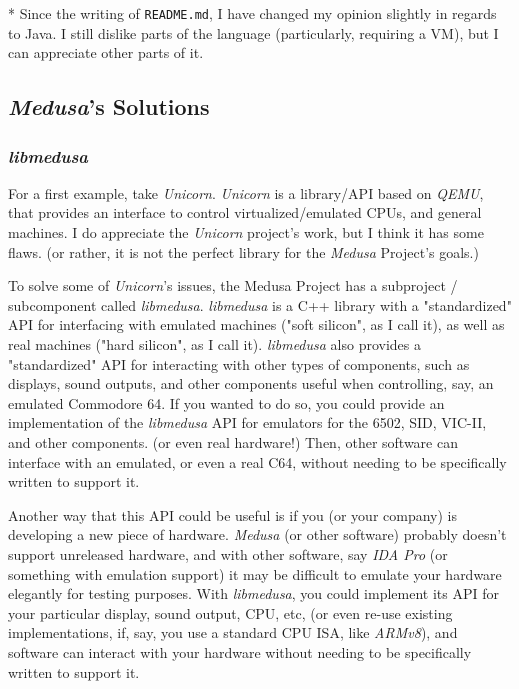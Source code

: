 \documentclass{article}
\begin{document}
	* Since the writing of \texttt{README.md}, I have changed my opinion slightly
	in regards to Java. I still dislike parts of the language (particularly,
	requiring a VM), but I can appreciate other parts of it.

	\subsection{\textit{Medusa}'s Solutions}
	\subsubsection{\textit{libmedusa}}
	For a first example, take \textit{Unicorn}. \textit{Unicorn} is a
	library/API based on \textit{QEMU}, that provides an interface to control
	virtualized/emulated CPUs, and general machines. I do appreciate the
	\textit{Unicorn} project's work, but I think it has some flaws. (or rather,
	it is not the perfect library for the \textit{Medusa} Project's goals.)

	To solve some of \textit{Unicorn}'s issues, the Medusa Project has a
	subproject / subcomponent called \textit{libmedusa}. \textit{libmedusa} is
	a C++ library with a "standardized" API for interfacing with emulated
	machines ("soft silicon", as I call it), as well as real machines ("hard
	silicon", as I call it). \textit{libmedusa} also provides a "standardized"
	API for interacting with other types of components, such as displays, sound
	outputs, and other components useful when controlling, say, an emulated
	Commodore 64. If you wanted to do so, you could provide an implementation of
	the \textit{libmedusa} API for emulators for the 6502, SID, VIC-II, and
	other components. (or even real hardware!) Then, other software can
	interface with an emulated, or even a real C64, without needing to be
	specifically written to support it.

	Another way that this API could be useful is if you (or your company) is
	developing a new piece of hardware. \textit{Medusa} (or other software)
	probably doesn't support unreleased hardware, and with other software, say
	\textit{IDA Pro} (or something with emulation support) it may be difficult
	to emulate your hardware elegantly for testing purposes. With
	\textit{libmedusa}, you could implement its API for your particular display,
	sound output, CPU, etc, (or even re-use existing implementations, if, say,
	you use a standard CPU ISA, like \textit{ARMv8}), and software can interact
	with your hardware without needing to be specifically written to support it.
\end{document}
